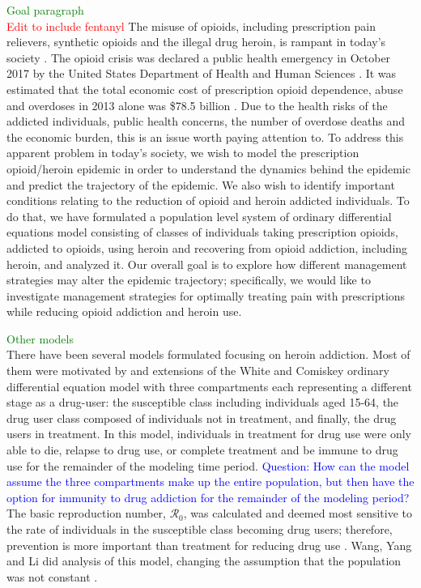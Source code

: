 \documentclass[12pt]{article}
\begin{document}
\textcolor{green}{Goal paragraph} \\ 
\textcolor{red}{Edit to include fentanyl}
The misuse of opioids, including prescription pain relievers, synthetic opioids and the illegal drug heroin, is rampant in today's society \cite{NIH2}. The opioid crisis was declared a public health emergency in October 2017 by the United States Department of Health and Human Sciences \cite{HHS1}. It was estimated that the total economic cost of prescription opioid dependence, abuse and overdoses in 2013 alone was \$78.5 billion \cite{Florence}. Due to the health risks of the addicted individuals, public health concerns, the number of overdose deaths and the economic burden, this is an issue worth paying attention to.
To address this apparent problem in today's society, we wish to model the prescription opioid/heroin epidemic in order to understand the dynamics behind the epidemic and predict the trajectory of the epidemic. We also wish to identify important conditions relating to the reduction of opioid and heroin addicted individuals. To do that, we have formulated a population level system of ordinary differential equations model consisting of classes of individuals taking prescription opioids, addicted to opioids, using heroin and recovering from opioid addiction, including heroin, and analyzed it. Our overall goal is to explore how different management strategies may alter the epidemic trajectory; specifically, we would like to investigate management strategies for optimally treating pain with prescriptions while reducing opioid addiction and heroin use. 

\textcolor{green}{Other models} \\
There have been several models formulated focusing on heroin addiction. Most of them were motivated by and extensions of the White and Comiskey ordinary differential equation model with three compartments each representing a different stage as a drug-user: the susceptible class including individuals aged 15-64, the drug user class composed of individuals not in treatment, and finally, the drug users in treatment. In this model, individuals in treatment for drug use were only able to die, relapse to drug use, or complete treatment and be immune to drug use for the remainder of the modeling time period. \textcolor{blue}{Question: How can the model assume the three compartments make up the entire population, but then have the option for immunity to drug addiction for the remainder of the modeling period?} The basic reproduction number, $\mathscr{R}_0$, was calculated and deemed most sensitive to the rate of individuals in the susceptible class becoming drug users; therefore, prevention is more important than treatment for reducing drug use \cite{White}. Wang, Yang and Li did analysis of this model, changing the assumption that the population was not constant \cite{Wang}. 
\end{document}

